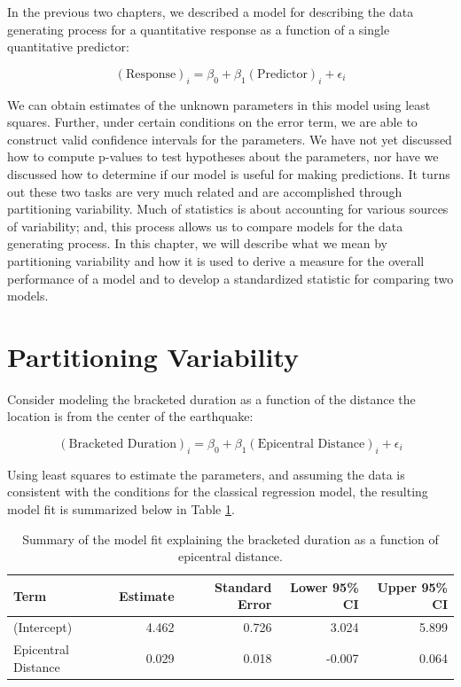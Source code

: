 \documentclass[]{book}
\theoremstyle{plain}
\theoremstyle{mydefn}
\theoremstyle{myexmpl}
\theoremstyle{remark}
\begin{document}
In the previous two chapters, we described a model for describing the
data generating process for a quantitative response as a function of a
single quantitative predictor:

\[(\text{Response})_i = \beta_0 + \beta_1 (\text{Predictor})_i + \epsilon_i\]

We can obtain estimates of the unknown parameters in this model using
least squares. Further, under certain conditions on the error term, we
are able to construct valid confidence intervals for the parameters. We
have not yet discussed how to compute p-values to test hypotheses about
the parameters, nor have we discussed how to determine if our model is
useful for making predictions. It turns out these two tasks are very
much related and are accomplished through partitioning variability. Much
of statistics is about accounting for various sources of variability;
and, this process allows us to compare models for the data generating
process. In this chapter, we will describe what we mean by partitioning
variability and how it is used to derive a measure for the overall
performance of a model and to develop a standardized statistic for
comparing two models.

\section{Partitioning Variability}\label{partitioning-variability}

Consider modeling the bracketed duration as a function of the distance
the location is from the center of the earthquake:

\[(\text{Bracketed Duration})_i = \beta_0 + \beta_1(\text{Epicentral Distance})_i + \epsilon_i\]

Using least squares to estimate the parameters, and assuming the data is
consistent with the conditions for the classical regression model, the
resulting model fit is summarized below in Table
\ref{tab:regquality-fit}.

\begin{table}

\caption{\label{tab:regquality-fit}Summary of the model fit explaining the bracketed duration as a function of epicentral distance.}
\centering
\begin{tabular}[t]{l|r|r|r|r}
\hline
Term & Estimate & Standard Error & Lower 95\% CI & Upper 95\% CI\\
\hline
(Intercept) & 4.462 & 0.726 & 3.024 & 5.899\\
\hline
Epicentral Distance & 0.029 & 0.018 & -0.007 & 0.064\\
\hline
\end{tabular}
\end{table}
\end{document}
